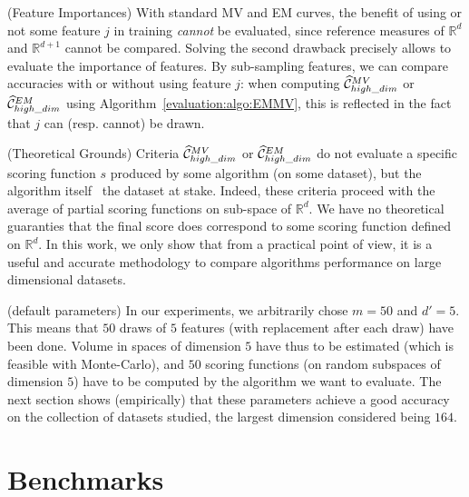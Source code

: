 \begin{remark}({\sc Feature Importances})
With standard MV and EM curves, the benefit of using or not some feature $j$ in training \emph{cannot} be evaluated, since reference measures of $\mathbb{R}^d$ and $\mathbb{R}^{d+1}$ cannot be compared.
%
Solving the second drawback precisely allows to evaluate the importance of features.
By sub-sampling features, we can compare accuracies with or without using feature $j$: when computing $\widehat{\mathcal{C}}^{MV}_{high\_dim}$ or $\widehat{\mathcal{C}}^{EM}_{high\_dim}$ using Algorithm~\ref{evaluation:algo:EMMV}, this is reflected in the fact that $j$ can (resp. cannot) be drawn.
\end{remark}

\begin{remark}({\sc Theoretical Grounds})
Criteria $\widehat{\mathcal{C}}^{MV}_{high\_dim}$ or $\widehat{\mathcal{C}}^{EM}_{high\_dim}$ do not evaluate a specific scoring function $s$ produced by some algorithm (on some dataset), but the algorithm itself \wrt~the dataset at stake. Indeed, these criteria proceed with the average of partial scoring functions on sub-space of $\mathbb{R}^d$. We have no theoretical guaranties that the final score does correspond to some scoring function defined on $\mathbb{R}^d$. In this work, we only show that from a practical point of view, it is a useful and accurate methodology to compare algorithms performance on large dimensional datasets.
\end{remark}

\begin{remark}({\sc default parameters}) 
In our experiments, we arbitrarily chose $m = 50$ and $d'=5$. This means that $50$ draws of $5$ features (with replacement after each draw) have been done. Volume in spaces of dimension $5$ have thus to be estimated (which is feasible with Monte-Carlo), and $50$ scoring functions (on random subspaces of dimension $5$) have to be computed by the algorithm we want to evaluate.
The next section shows (empirically) that these parameters achieve a good accuracy on the collection of datasets studied, the largest dimension considered being $164$.
\end{remark}

\section{Benchmarks}
\label{evaluation:sec:benchmarks}

